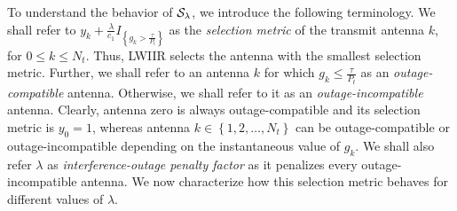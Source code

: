 \documentclass[12pt,draftcls,peerreview,onecolumn]{IEEEtran}
\newcommand{\cbrac}[1]{\left\{{#1}\right\}}
\newcommand{\indic}[1]{I_{\cbrac{#1}}}
\newcommand{\lam}{\lambda}
\newcommand{\Nt}{{N_t}}
\newcommand{\Pt}{{P_t}}
\newcommand{\puch}{g}
\newcommand{\gk}[1]{{\puch_{#1}}}
\newcommand{\itau}{\tau}
\newcommand{\cone}{c_{1}}
\newcommand{\taubypt}{\frac{\itau}{\Pt}}
\newcommand{\gkgrtaubypt}[1]{{\gk{#1}}>\taubypt}
\newcommand{\gklttaubypt}[1]{{\gk{#1}}\leq\taubypt}
\newcommand{\gindic}[1]{\indic{\gkgrtaubypt{#1}}}
\newcommand{\lambym}{\frac{\lam}{\cone}}
\newcommand{\yk}[1]{y_{#1}}
\newcommand{\ykplusgk}[1]{ \yk{#1} + \lambym\gindic{#1}}
\newcommand{\antopts}{\left\{1,2,\ldots,\Nt\right\}}
\newcommand{\callamrule}{{\cal S_{{\lam}}}}
\begin{document}
To understand the behavior of $\callamrule$, we introduce the following terminology. We shall refer to 
$\ykplusgk{k}$
as the {\em selection metric} of the transmit antenna $k$, for $0\leq k \leq\Nt$. Thus, LWIIR selects the antenna with the smallest selection metric. Further, we shall refer to an antenna $k$ for which $\gklttaubypt{k}$ as an {\em outage-compatible} antenna. Otherwise, we shall refer to it as an {\em outage-incompatible} antenna.  Clearly, antenna zero is always outage-compatible and its selection metric is $\yk{0}=1$, whereas antenna $k\in\antopts$ can be outage-compatible or outage-incompatible depending on the instantaneous value of $\gk{k}$. We shall also refer $\lam$ as {\em interference-outage penalty factor} as it penalizes every outage-incompatible antenna. We now characterize  how this selection metric behaves for different values of $\lam$.
\end{document}

